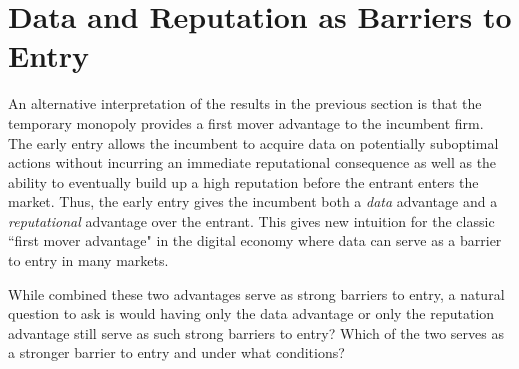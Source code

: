 \documentclass[../competing_bandits.tex]{subfiles}
\begin{document}
\section{Data and Reputation as Barriers to Entry}\label{section:6}

An alternative interpretation of the results in the previous section is that the temporary monopoly provides a first mover advantage to the incumbent firm. The early entry allows the incumbent to acquire data on potentially suboptimal actions without incurring an immediate reputational consequence as well as the ability to eventually build up a high reputation before the entrant enters the market. Thus, the early entry gives the incumbent both a \textit{data} advantage and a \textit{reputational} advantage over the entrant. This gives new intuition for the classic ``first mover advantage" \cite{kerin1992first} in the digital economy where data can serve as a barrier to entry in many markets.

While combined these two advantages serve as strong barriers to entry,
a natural question to ask is would having only the data advantage or
only the reputation advantage still serve as such strong barriers to
entry? Which of the two serves as a stronger barrier to entry and
under what conditions?


\end{document}
